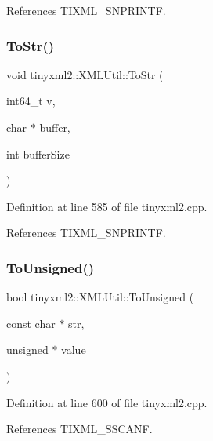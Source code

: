 References T\+I\+X\+M\+L\+\_\+\+S\+N\+P\+R\+I\+N\+TF.

\mbox{\label{classtinyxml2_1_1_x_m_l_util_a26a8cb5b833ad587b3af39469c8111de}} 
\subsubsection{To\+Str()\hspace{0.1cm}{\footnotesize\ttfamily [6/6]}}
{\footnotesize\ttfamily void tinyxml2\+::\+X\+M\+L\+Util\+::\+To\+Str (\begin{DoxyParamCaption}\item[{int64\+\_\+t}]{v,  }\item[{char $\ast$}]{buffer,  }\item[{int}]{buffer\+Size }\end{DoxyParamCaption})\hspace{0.3cm}{\ttfamily [static]}}



Definition at line 585 of file tinyxml2.\+cpp.



References T\+I\+X\+M\+L\+\_\+\+S\+N\+P\+R\+I\+N\+TF.

\mbox{\label{classtinyxml2_1_1_x_m_l_util_a210c8637d5eb4ce3d4625294af0efc2f}} 
\subsubsection{To\+Unsigned()}
{\footnotesize\ttfamily bool tinyxml2\+::\+X\+M\+L\+Util\+::\+To\+Unsigned (\begin{DoxyParamCaption}\item[{const char $\ast$}]{str,  }\item[{unsigned $\ast$}]{value }\end{DoxyParamCaption})\hspace{0.3cm}{\ttfamily [static]}}



Definition at line 600 of file tinyxml2.\+cpp.



References T\+I\+X\+M\+L\+\_\+\+S\+S\+C\+A\+NF.




